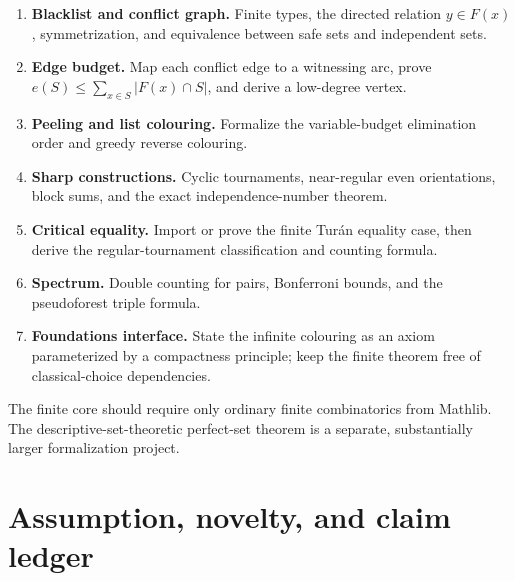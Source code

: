 \documentclass[11pt]{article}
\theoremstyle{definition}
\theoremstyle{remark}
\begin{document}
\begin{enumerate}[label=\texttt{M\arabic*.}]
\item \textbf{Blacklist and conflict graph.}  Finite types, the directed
relation $y\in F(x)$, symmetrization, and equivalence between safe sets and
independent sets.
\item \textbf{Edge budget.}  Map each conflict edge to a witnessing arc,
prove $e(S)\le\sum_{x\in S}|F(x)\cap S|$, and derive a low-degree vertex.
\item \textbf{Peeling and list colouring.}  Formalize the variable-budget
elimination order and greedy reverse colouring.
\item \textbf{Sharp constructions.}  Cyclic tournaments, near-regular even
orientations, block sums, and the exact independence-number theorem.
\item \textbf{Critical equality.}  Import or prove the finite Tur\'an equality
case, then derive the regular-tournament classification and counting formula.
\item \textbf{Spectrum.}  Double counting for pairs, Bonferroni bounds, and
the pseudoforest triple formula.
\item \textbf{Foundations interface.}  State the infinite colouring as an
axiom parameterized by a compactness principle; keep the finite theorem free
of classical-choice dependencies.
\end{enumerate}

The finite core should require only ordinary finite combinatorics from
Mathlib.  The descriptive-set-theoretic perfect-set theorem is a separate,
substantially larger formalization project.

\section{Assumption, novelty, and claim ledger}\label{fbl:sec:ledger}
\end{document}

